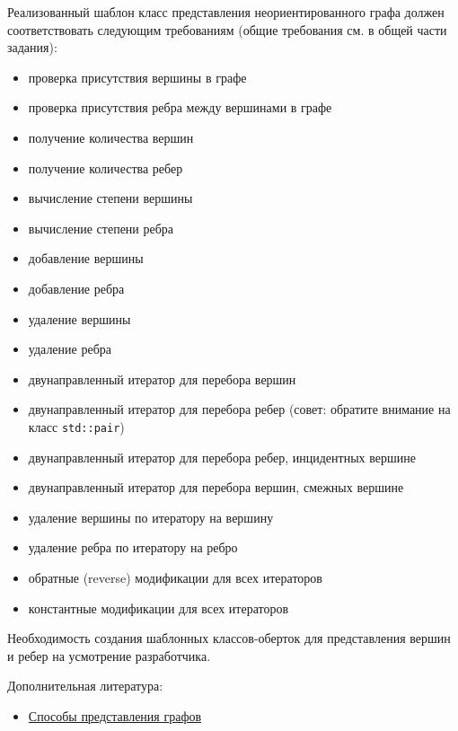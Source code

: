 \documentclass[a4paper,12pt]{article}
\begin{document}
Реализованный шаблон класс представления неориентированного графа
должен соответствовать следующим требованиям (общие требования см. в
общей части задания):

\begin{itemize}
\item проверка присутствия вершины в графе
\item проверка присутствия ребра между вершинами в графе
\item получение количества вершин
\item получение количества ребер
\item вычисление степени вершины
\item вычисление степени ребра
\item добавление вершины
\item добавление ребра
\item удаление вершины
\item удаление ребра
\item двунаправленный итератор для перебора вершин
\item двунаправленный итератор для перебора ребер (совет: обратите
  внимание на класс \lstinline|std::pair|)
\item двунаправленный итератор для перебора ребер, инцидентных вершине
\item двунаправленный итератор для перебора вершин, смежных вершине
\item удаление вершины по итератору на вершину
\item удаление ребра по итератору на ребро
\item обратные (reverse) модификации для всех итераторов
\item константные модификации для всех итераторов
\end{itemize}

Необходимость создания шаблонных классов-оберток для представления
вершин и ребер на усмотрение разработчика.

Дополнительная литература:
\begin{itemize}
\item
  \href{http://khpi-iip.mipk.kharkiv.edu/library/datastr/book_sod/kgsu/oglav4.html}{Способы
    представления графов}
\end{itemize}

\newcommand{\graphvar}[1]{%
\subsection{#1}

Основные требования смотреть в
\ref{sec:Variant_undir_graph_adj_matrix}. }
\end{document}
